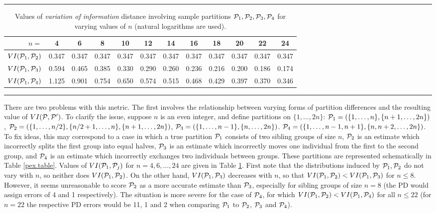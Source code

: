 \documentclass[twoside,10pt,twocolumn]{article}
\newcommand{\calp}{{\cal P}}
\begin{document}
\begin{table}
\caption{Values of \emph{variation of information} distance involving sample partitions $\calp_1, \calp_2, \calp_3, \calp_4$ for varying values of $n$ (natural logarithms are used).}\label{vi.table}
\rule{\textwidth}{0.90pt}
\begin{center}
\begin{tabular}{r|ccccccccccc}
\multicolumn{1}{r}{$n=$} &   4  & 6  & 8  & 10  & 12  & 14  & 16  & 18  & 20  & 22  & 24 \\ \hline
$VI(\calp_1, \calp_2)$ & 0.347  &  0.347  & 0.347  &  0.347  & 0.347   & 0.347   & 0.347   & 0.347   & 0.347   & 0.347   & 0.347 \\
$VI(\calp_1, \calp_3)$ & 0.594  & 0.465  & 0.385   & 0.330   & 0.290   & 0.260   & 0.236   & 0.216   & 0.200   & 0.186   & 0.174 \\
$VI(\calp_1, \calp_4)$ & 1.125  & 0.901  & 0.754   & 0.650   & 0.574   & 0.515   & 0.468   & 0.429   & 0.397   & 0.370   & 0.346
\end{tabular}
\end{center}
\rule{\textwidth}{0.90pt}
\end{table}


There are two problems with this metric. The first involves the relationship between varying forms of 
partition differences and the resulting value of  $VI(\calp, \calp^\prime)$. To clarify the issue, suppose 
$n$ is an even integer, and define partitions on $\{ 1,\ldots, 2n \}$: $\calp_1 = ( \{1,\ldots, n\}, \{n+1, 
\ldots, 2n\}  )$,  $\calp_2 = ( \{1, \ldots, n/2\}, \{n/2+1, \ldots,  n\}, \{ n+1, \ldots, 2n\} )$, $\calp_3 
= ( \{1, \ldots, n-1\}, \{n , \ldots, 2n\} )$. $\calp_4 = ( \{1, \ldots, n-1, n+1\}, \{n , n+2, \ldots, 2n
\} )$. To fix ideas, this may correspond to a case in which a true partition $\calp_1$ consists of two 
sibling groups of size $n$,  $\calp_2$ is an estimate which incorrectly splits the first group into equal 
halves, $\calp_3$ is an estimate which incorrectly moves one individual from the first to the second group, 
and $\calp_4$ is an estimate which incorrectly exchanges two individuals between groups. These partitions 
are represented schematically in Table \ref{pex.table}.  Values of $VI(\calp_1, \calp_j)$ for $n = 4, 6, 
\ldots, 24$ are given in Table \ref{vi.table}. First note that the distributions induced by $\calp_1, 
\calp_2$ do not vary with $n$, so neither does $VI(\calp_1, \calp_2)$. On the other hand, $VI(\calp_1, 
\calp_3)$ decreases with $n$, so that $VI(\calp_1, \calp_2) <  VI(\calp_1, \calp_3)$ for $n \leq 8$. 
However, it seems unreasonable to score  $\calp_2$ as a more accurate estimate than $\calp_3$, especially 
for sibling groups of size $n = 8$ (the PD would assign errors of 4 and 1 respectively).  The situation is 
more severe for the case of $\calp_4$, for which $VI(\calp_1, \calp_2) <  VI(\calp_1, \calp_4)$ for all $n 
\leq 22$ (for $n = 22$ the respective PD errors would be 11, 1 and 2 when comparing $\calp_1$ to $\calp_2$, 
$\calp_3$ and $\calp_4$). 
\end{document}
